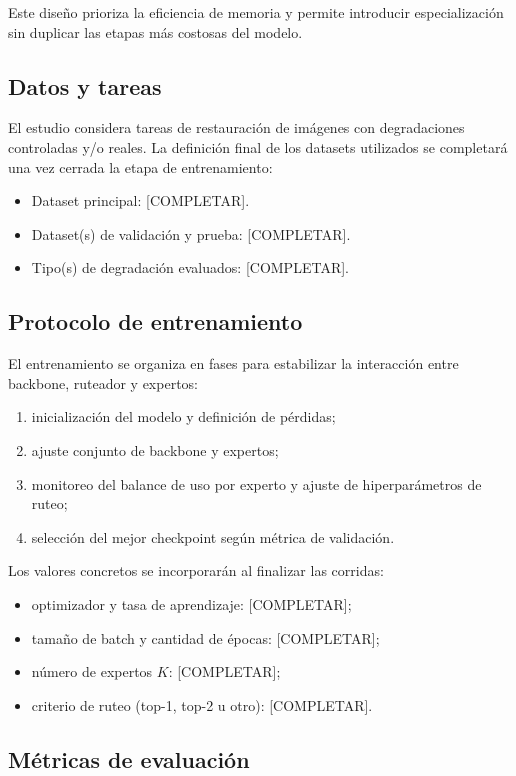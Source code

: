 \documentclass[aps,prl,twocolumn,groupedaddress]{revtex4-2}
\begin{document}
Este diseño prioriza la eficiencia de memoria y permite introducir especialización sin duplicar las etapas más costosas del modelo.

\subsection{Datos y tareas}

El estudio considera tareas de restauración de imágenes con degradaciones controladas y/o reales. La definición final de los datasets utilizados se completará una vez cerrada la etapa de entrenamiento:
\begin{itemize}
    \item Dataset principal: [COMPLETAR].
    \item Dataset(s) de validación y prueba: [COMPLETAR].
    \item Tipo(s) de degradación evaluados: [COMPLETAR].
\end{itemize}

\subsection{Protocolo de entrenamiento}

El entrenamiento se organiza en fases para estabilizar la interacción entre backbone, ruteador y expertos:
\begin{enumerate}
    \item inicialización del modelo y definición de pérdidas;
    \item ajuste conjunto de backbone y expertos;
    \item monitoreo del balance de uso por experto y ajuste de hiperparámetros de ruteo;
    \item selección del mejor checkpoint según métrica de validación.
\end{enumerate}

Los valores concretos se incorporarán al finalizar las corridas:
\begin{itemize}
    \item optimizador y tasa de aprendizaje: [COMPLETAR];
    \item tamaño de batch y cantidad de épocas: [COMPLETAR];
    \item número de expertos $K$: [COMPLETAR];
    \item criterio de ruteo (top-1, top-2 u otro): [COMPLETAR].
\end{itemize}

\subsection{Métricas de evaluación}
\end{document}
